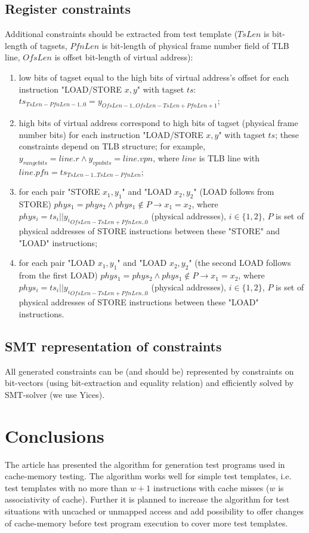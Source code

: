 \documentclass[times, 10pt,twocolumn]{article}
\begin{document}
\subsection{Register constraints}
Additional constraints should be extracted from test template ($TsLen$ is bit-length of tagsets, $PfnLen$ is bit-length of physical frame number field of TLB line, $OfsLen$ is offset bit-length of virtual address):
\begin{enumerate}
\item 
 low bits of tagset equal to the high bits of virtual address's offset for each instruction "LOAD/STORE $x, y$" with tagset $ts$:  $ts_{TsLen-PfnLen-1..0} = y_{OfsLen-1..OfsLen-TsLen+PfnLen+1}$;
\item high bits of virtual address correspond to high bits of tagset (physical frame number bits) for each instruction "LOAD/STORE $x, y$" with tagset $ts$; these constraints depend on TLB structure; for example, $y_{range bits} = line.r \wedge y_{vpn bits} = line.vpn$, where $line$ is TLB line with $line.pfn = ts_{TsLen-1..TsLen-PfnLen}$;
\item for each pair "STORE $x_1, y_1$" and "LOAD $x_2, y_2$" (LOAD follows from STORE) $phys_1 = phys_2 \wedge phys_1 \notin P \rightarrow x_1 = x_2$, where $phys_i = ts_i || {y_i}_{OfsLen-TsLen+PfnLen..0}$ (physical addresses), $i \in \{1, 2\}$, $P$ is set of physical addresses of STORE instructions between these "STORE" and "LOAD" instructions;
\item for each pair "LOAD $x_1, y_1$" and "LOAD $x_2, y_2$" (the second LOAD follows from the first LOAD) $phys_1 = phys_2 \wedge phys_1 \notin P \rightarrow x_1 = x_2$, where $phys_i = ts_i || {y_i}_{OfsLen-TsLen+PfnLen..0}$ (physical addresses), $i \in \{1, 2\}$, $P$ is set of physical addresses of STORE instructions between these "LOAD" instructions.
\end{enumerate}

\subsection{SMT representation of constraints}
All generated constraints can be (and should be) represented by constraints on bit-vectors (using bit-extraction and equality relation) and efficiently solved by SMT-solver (we use Yices).

\section{Conclusions}
The article has presented the algorithm for generation test programs used in cache-memory testing. The algorithm works well for simple test templates, i.e. test templates with no more than $w+1$ instructions with cache misses ($w$ is associativity of cache). Further it is planned to increase the algorithm for test situations with uncached or unmapped access and add possibility to offer changes of cache-memory before test program execution to cover more test templates.




\end{document}
